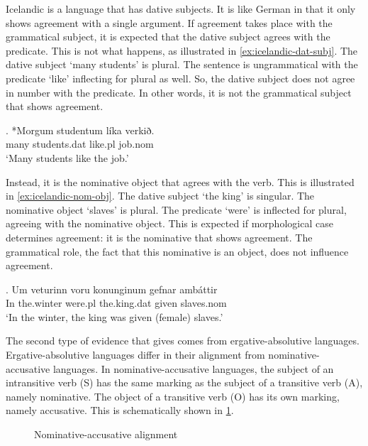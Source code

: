 Icelandic is a language that has dative subjects. It is like German in that it only shows agreement with a single argument. If agreement takes place with the grammatical subject, it is expected that the dative subject agrees with the predicate. This is not what happens, as illustrated in \ref{ex:icelandic-dat-subj}. The dative subject  `many students' is plural. The sentence is ungrammatical with the predicate  `like' inflecting for plural as well. So, the dative subject does not agree in number with the predicate. In other words, it is not the grammatical subject that shows agreement.

\exg. *Morgum studentum líka verkið.\\
 many students.\ac{dat} like.\ac{pl} job.\ac{nom} \\
`Many students like the job.' \label{ex:icelandic-dat-subj}

Instead, it is the nominative object that agrees with the verb. This is illustrated in \ref{ex:icelandic-nom-obj}. The dative subject  `the king' is singular. The nominative object  `slaves' is plural. The predicate  `were' is inflected for plural, agreeing with the nominative object. This is expected if morphological case determines agreement: it is the nominative that shows agreement. The grammatical role, the fact that this nominative is an object, does not influence agreement.

\exg. Um veturinn voru konunginum gefnar ambáttir\\
In the.winter were.\ac{pl} the.king.\ac{dat} given slaves.\ac{nom}\\
`In the winter, the king was given (female) slaves.' \label{ex:icelandic-nom-obj}

The second type of evidence that \citeauthor{bobaljik2006} gives comes from ergative-absolutive languages. Ergative-absolutive languages differ in their alignment from nominative-accusative languages. In nominative-accusative languages, the subject of an intransitive verb (S) has the same marking as the subject of a transitive verb (A), namely nominative. The object of a transitive verb (O) has its own marking, namely accusative. This is schematically shown in \ref{fig:nom-acc-lang}.

\begin{figure}[ht]
  \centering
  \caption{Nominative-accusative alignment}
  \label{fig:nom-acc-lang}
\end{figure}


